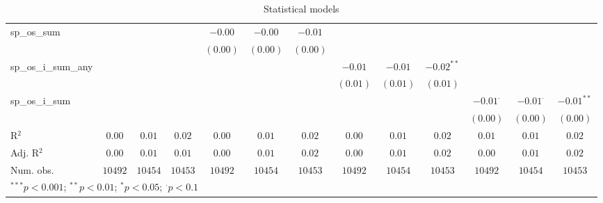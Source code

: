 \begin{sidewaystable}
\begin{center}
{\begin{tabular}{l c c c c c c c c c c c c}
sp\_os\_sum         &               &                 &                 & $-0.00$       & $-0.00$         & $-0.01$         &               &                 &                &                 &                 &                 \\
                    &               &                 &                 & $(0.00)$      & $(0.00)$        & $(0.00)$        &               &                 &                &                 &                 &                 \\
sp\_os\_i\_sum\_any &               &                 &                 &               &                 &                 & $-0.01$       & $-0.01$         & $-0.02^{**}$   &                 &                 &                 \\
                    &               &                 &                 &               &                 &                 & $(0.01)$      & $(0.01)$        & $(0.01)$       &                 &                 &                 \\
sp\_os\_i\_sum      &               &                 &                 &               &                 &                 &               &                 &                & $-0.01^{\cdot}$ & $-0.01^{\cdot}$ & $-0.01^{**}$    \\
                    &               &                 &                 &               &                 &                 &               &                 &                & $(0.00)$        & $(0.00)$        & $(0.00)$        \\
\hline
R$^2$               & $0.00$        & $0.01$          & $0.02$          & $0.00$        & $0.01$          & $0.02$          & $0.00$        & $0.01$          & $0.02$         & $0.01$          & $0.01$          & $0.02$          \\
Adj. R$^2$          & $0.00$        & $0.01$          & $0.01$          & $0.00$        & $0.01$          & $0.02$          & $0.00$        & $0.01$          & $0.02$         & $0.00$          & $0.01$          & $0.02$          \\
Num. obs.           & $10492$       & $10454$         & $10453$         & $10492$       & $10454$         & $10453$         & $10492$       & $10454$         & $10453$        & $10492$         & $10454$         & $10453$         \\
\hline
\multicolumn{13}{l}{\scriptsize{$^{***}p<0.001$; $^{**}p<0.01$; $^{*}p<0.05$; $^{\cdot}p<0.1$}}
\end{tabular}
}
\caption{Statistical models}
\label{table:coefficients}
\end{center}
\end{sidewaystable}
